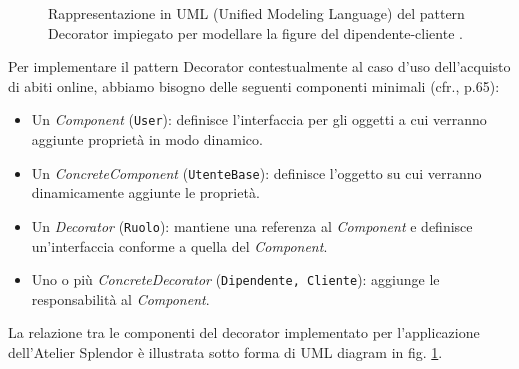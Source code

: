 \documentclass[12pt]{article}
\begin{document}
\begin{figure}[!t]
  \caption{\small Rappresentazione in UML (Unified Modeling Language) del pattern Decorator impiegato per modellare la figure del dipendente-cliente \cite{uml_riferimento}.}
  \label{fig:uml_diagram_decorator}
\end{figure}

Per implementare il pattern Decorator contestualmente al caso d'uso dell'acquisto di abiti online, abbiamo bisogno delle seguenti componenti minimali (cfr.\cite{gof_sunt}, p.65):
\begin{itemize}
    \item Un {\em Component} ({\tt User}): definisce l'interfaccia per gli oggetti a cui verranno aggiunte proprietà in modo dinamico.
    \item Un {\em ConcreteComponent} ({\tt UtenteBase}): definisce l'oggetto su cui verranno dinamicamente aggiunte le proprietà.
    \item Un {\em Decorator} ({\tt Ruolo}): mantiene una referenza al {\em Component} e definisce un'interfaccia conforme a quella del {\em Component}.
    \item Uno o più {\em ConcreteDecorator} ({\tt Dipendente, Cliente}): aggiunge le responsabilità al {\em Component}.
\end{itemize}
La relazione tra le componenti del decorator implementato per l'applicazione dell'Atelier Splendor è illustrata sotto forma di UML diagram in fig. \ref{fig:uml_diagram_decorator}.
\end{document}
